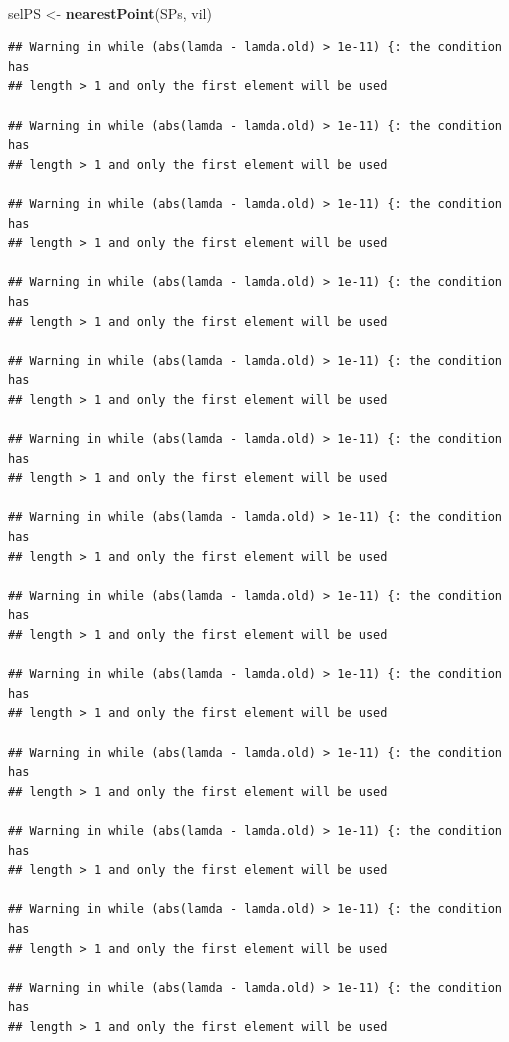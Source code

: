 \documentclass[11pt,a4paper]{article}
\newenvironment{Shaded}{}{}
\newcommand{\KeywordTok}[1]{\textcolor[rgb]{0.00,0.44,0.13}{\textbf{#1}}}
\newcommand{\StringTok}[1]{\textcolor[rgb]{0.25,0.44,0.63}{#1}}
\newcommand{\NormalTok}[1]{#1}
\begin{document}
~

\begin{Shaded}
\begin{Highlighting}[]
\NormalTok{selPS <-}\StringTok{ }\KeywordTok{nearestPoint}\NormalTok{(SPs, vil)}
\end{Highlighting}
\end{Shaded}

\begin{verbatim}
## Warning in while (abs(lamda - lamda.old) > 1e-11) {: the condition has
## length > 1 and only the first element will be used

## Warning in while (abs(lamda - lamda.old) > 1e-11) {: the condition has
## length > 1 and only the first element will be used

## Warning in while (abs(lamda - lamda.old) > 1e-11) {: the condition has
## length > 1 and only the first element will be used

## Warning in while (abs(lamda - lamda.old) > 1e-11) {: the condition has
## length > 1 and only the first element will be used

## Warning in while (abs(lamda - lamda.old) > 1e-11) {: the condition has
## length > 1 and only the first element will be used

## Warning in while (abs(lamda - lamda.old) > 1e-11) {: the condition has
## length > 1 and only the first element will be used

## Warning in while (abs(lamda - lamda.old) > 1e-11) {: the condition has
## length > 1 and only the first element will be used

## Warning in while (abs(lamda - lamda.old) > 1e-11) {: the condition has
## length > 1 and only the first element will be used

## Warning in while (abs(lamda - lamda.old) > 1e-11) {: the condition has
## length > 1 and only the first element will be used

## Warning in while (abs(lamda - lamda.old) > 1e-11) {: the condition has
## length > 1 and only the first element will be used

## Warning in while (abs(lamda - lamda.old) > 1e-11) {: the condition has
## length > 1 and only the first element will be used

## Warning in while (abs(lamda - lamda.old) > 1e-11) {: the condition has
## length > 1 and only the first element will be used

## Warning in while (abs(lamda - lamda.old) > 1e-11) {: the condition has
## length > 1 and only the first element will be used


\end{verbatim}
\end{document}
